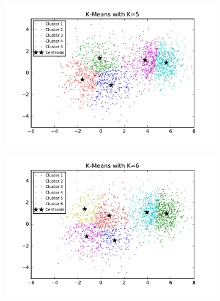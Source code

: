 \begin{description}
\begin{figure}[htb]
\begin{subfigure}[b]{0.475\textwidth}
        \end{subfigure}
        \begin{subfigure}[b]{0.475\textwidth}  
            \centering 
            \includegraphics[width=\textwidth]{./figures/clustering_kMeans_5.pdf}
        \end{subfigure}
        \hfill
        \begin{subfigure}[b]{0.475\textwidth}   
            \centering 
            \includegraphics[width=\textwidth]{./figures/clustering_kMeans_6.pdf}
        \end{subfigure}
        \begin{subfigure}[b]{0.475\textwidth}   
            \centering 

\end{subfigure}
\end{figure}
\end{description}

